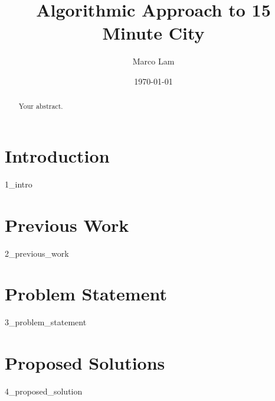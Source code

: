 \documentclass{article}
\title{Algorithmic Approach to 15 Minute City}
\author{Marco Lam}
\date{\today}
\begin{document}
\maketitle

\begin{abstract}
    Your abstract.
\end{abstract}

\newpage

\tableofcontents
\listoffigures
\listoftables
\listofalgorithms
\newpage

\section{Introduction}

{1_intro}

\newpage

\section{Previous Work}

{2_previous_work}

\newpage

\section{Problem Statement}

{3_problem_statement}

\newpage

\section{Proposed Solutions}

{4_proposed_solution}

\newpage


\end{document}
